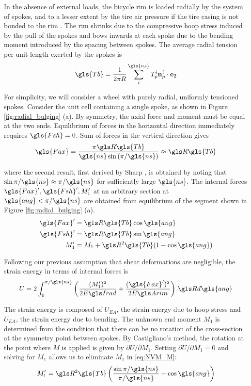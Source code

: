 \documentclass[\rootdir/thesis.tex]{subfiles}
\begin{document}
In the absence of external loads, the bicycle rim is loaded radially by the system of spokes, and to a lesser extent by the tire air pressure if the tire casing is not bonded to the rim \cite{Burgoyne1993}. The rim shrinks due to the compressive hoop stress induced by the pull of the spokes and bows inwards at each spoke due to the bending moment introduced by the spacing between spokes. The average radial tension per unit length exerted by the spokes is
\begin{equation}
\label{eq:Tbar}
\gls{Tb} = \frac{1}{2\pi R} \sum_i^{\gls{ns}} T_p^i \mathbf{n}_p^i \cdot\et
\end{equation}

For simplicity, we will consider a wheel with purely radial, uniformly tensioned spokes. Consider the unit cell containing a single spoke, as shown in Figure \ref{fig:radial_bulging} (a). By symmetry, the axial force and moment must be equal at the two ends. Equilibrium of forces in the horizontal direction immediately requires $\gls{Fsh}=0$. Sum of forces in the vertical direction gives
\begin{equation}
\label{eq:Nr}
\gls{Fax} = \frac{\pi \R\gls{Tb}}{\gls{ns}\sin{(\pi/\gls{ns})}} \approx \R\gls{Tb}
\end{equation}

where the second result, first derived by Sharp \cite{Sharp1977}, is obtained by noting that $\sin{\pi/\gls{ns}}\approx \pi/\gls{ns}$ for sufficiently large $\gls{ns}$. The internal forces $\gls{Fax}',\gls{Fsh}',M_1'$ at an arbitrary section at $\gls{ang} < \pi/\gls{ns}$ are obtained from equilibrium of the segment shown in Figure \ref{fig:radial_bulging} (a).
\begin{subequations}
\begin{align}
\gls{Fax}' &= \R\gls{Tb}\cos{\gls{ang}}\\
\gls{Fsh}' &= \R\gls{Tb}\sin{\gls{ang}}\\
M_1'       &= M_1 + \R^2\gls{Tb}(1-\cos{\gls{ang}})\label{eq:NVM_M}
\end{align}
\end{subequations}

Following our previous assumption that shear deformations are negligible, the strain energy in terms of internal forces is
\begin{equation}
U = 2\int_0^{\pi/\gls{ns}} \left(\frac{(M_1')^2}{2\EIr} + \frac{(\gls{Fax}')^2}{2\EA}\right)\, \R d\gls{ang}
\end{equation}

The strain energy is composed of $U_{EA}$, the strain energy due to hoop stress and $U_{EA}$, the strain energy due to bending. The unknown end moment $M_1$ is determined from the condition that there can be no rotation of the cross-section at the symmetry point between spokes. By Castigliano's method, the rotation at the point where $M$ is applied is given by $\partial U/\partial M_1$. Setting $\partial U/\partial M_1=0$ and solving for $M_1$ allows us to eliminate $M_1$ in \eqref{eq:NVM_M}:
\begin{equation}
M_1' = \R^2\gls{Tb} \left( \frac{\sin{\pi/\gls{ns}}}{\pi/\gls{ns}} - \cos{\gls{ang}} \right)
\end{equation}
\end{document}
